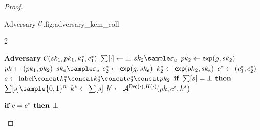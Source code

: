 \begin{proof}
\begin{itemize}
                                                                \begin{gamefigure}{Adversary $\mathcal{C}$.}{fig:adversary_kem_coll}
                                                                    \begin{games}{2}
                                                                        \begin{gameenv}{\textbf{Adversary} $\mathcal{C}(sk_1, pk_1, k_1^*, c_1^*)$}
                                                                            \State $\sum[\cdot] \leftarrow \bot$
                                                                            \State $\sk_2 \sample \exponent$
                                                                            \State $pk_2 \leftarrow \textsf{exp}(g, sk_2)$
                                                                            \State $pk \leftarrow (pk_1, pk_2)$
                                                                            \State $\sk_e \sample \exponent$
                                                                            \State $c^*_2 \leftarrow \textsf{exp}(g, sk_e)$
                                                                            \State $k^*_2 \leftarrow \textsf{exp}(pk_2, sk_e)$
                                                                            \State $c^* \leftarrow (c^*_1, c^*_2)$
                                                                            \State $s \assign \text{label} \concat k^*_1 \concat k^*_2 \concat c^*_2 \concat \pk_2$
                                                                            \State $\textbf{if } \sum[s] = \bot \textbf{ then}$
                                                                                \State \quad $\ROMtable[s] \sample \bits^{n}$
                                                                                \State $k^* \leftarrow \sum[s]$
                                                                                \State $b' \leftarrow \mathcal{A}^{\textsf{Dec}(\cdot), H(\cdot)}(pk, c^*, k^*)$
                                                                            \end{gameenv}
                                                                            \gamebreak
                                                                            \begin{gameenv}{\oracledec}
                                                                                \State $\textbf{if } c = c^* \textbf{ then}$
                                                                                    \State \quad \Return $\bot$

\end{gameenv}
\end{games}
\end{gamefigure}
\end{itemize}
\end{proof}
